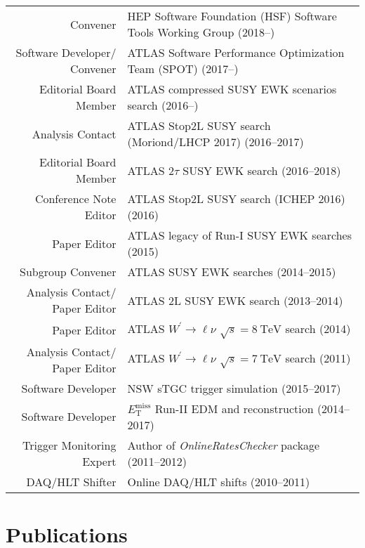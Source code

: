 \documentclass[a4paper,10pt]{article}
\begin{document}
\begin{tabular}{r | p{12cm}}
\multicolumn{1}{r|}{Convener}					& HEP Software Foundation (HSF) Software Tools Working Group \hfill (2018--\phantom{0000})				\\
\multicolumn{1}{r|}{Software Developer/ Convener}	& ATLAS Software Performance Optimization Team (SPOT) \hfill (2017--\phantom{0000})				\\
\multicolumn{1}{r|}{Editorial Board Member}		& ATLAS compressed SUSY EWK scenarios search \hfill (2016--\phantom{0000})				\\
\multicolumn{1}{r|}{Analysis Contact}				& ATLAS Stop2L SUSY search (Moriond/LHCP 2017)  \hfill (2016--2017)					\\
\multicolumn{1}{r|}{Editorial Board Member}		& ATLAS 2$\tau$ SUSY EWK search \hfill (2016--2018)				\\
\multicolumn{1}{r|}{Conference Note Editor}		& ATLAS Stop2L SUSY search (ICHEP 2016) \hfill (2016)					\\
\multicolumn{1}{r|}{Paper Editor}				& ATLAS legacy of Run-I SUSY EWK searches \hfill (2015) 		\\
\multicolumn{1}{r|}{Subgroup Convener}			& ATLAS SUSY EWK searches \hfill (2014--2015)				\\
\multicolumn{1}{r|}{Analysis Contact/ Paper Editor}	& ATLAS 2L SUSY EWK search \hfill (2013--2014)				\\
\multicolumn{1}{r|}{Paper Editor}				& ATLAS $W^{\prime}\rightarrow\ell\nu$ $\sqrt{s} = 8\ \mathrm{TeV}$  search \hfill (2014)		\\
\multicolumn{1}{r|}{Analysis Contact/ Paper Editor}	& ATLAS $W^{\prime}\rightarrow\ell\nu$ $\sqrt{s} = 7\ \mathrm{TeV}$ search \hfill (2011)		\\
\multicolumn{1}{r|}{Software Developer}			& NSW sTGC trigger simulation \hfill (2015--2017)	\\
\multicolumn{1}{r|}{Software Developer}			& $E_{\mathrm{T}}^{\mathrm{miss}}$ Run-II EDM and reconstruction \hfill (2014--2017)	\\
\multicolumn{1}{r|}{Trigger Monitoring Expert}		& Author of {\it OnlineRatesChecker} package \hfill (2011--2012)	\\
\multicolumn{1}{r|}{DAQ/HLT Shifter}				& Online DAQ/HLT shifts	\hfill (2010--2011)					\\
\end{tabular}

\vspace{3mm}
\section{Publications}
\end{document}
